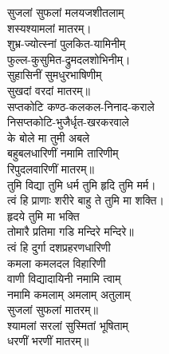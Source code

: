 
\vspace{-0.3cm}
सुजलां सुफलां मलयजशीतलाम्\\
शस्यश्यामलां मातरम्।\\
शुभ्र-ज्योत्स्नां पुलकित-यामिनीम्\\
फुल्ल-कुसुमित-द्रुमदलशोभिनीम्।\\
सुहासिनीं सुमधुरभाषिणीम्\\
सुखदां वरदां मातरम्॥\\
सप्तकोटि कण्ठ-कलकल-निनाद-कराले\\
निसप्तकोटि-भुजैर्धृत-खरकरवाले\\
के बोले मा तुमी अबले\\
बहुबलधारिणीं नमामि तारिणीम्\\
रिपुदलवारिणीं मातरम्॥\\
तुमि विद्या तुमि धर्म तुमि हृदि तुमि मर्म।\\
त्वं हि प्राणाः शरीरे बाहु ते तुमि मा शक्ति।\\
हृदये तुमि मा भक्ति\\
तोमारै प्रतिमा गडि मन्दिरे मन्दिरे॥\\
त्वं हि दुर्गा दशप्रहरणधारिणी\\
कमला कमलदल विहारिणी\\
वाणी विद्यादायिनी नमामि त्वाम्\\
नमामि कमलाम् अमलाम् अतुलाम्\\
सुजलां सुफलां मातरम्॥\\
श्यामलां सरलां सुस्मितां भूषिताम्\\
धरणीं भरणीं मातरम्॥\\

